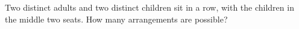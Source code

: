 Two distinct adults and two distinct children sit in a row, with the children in the middle two seats. How many arrangements are possible?
